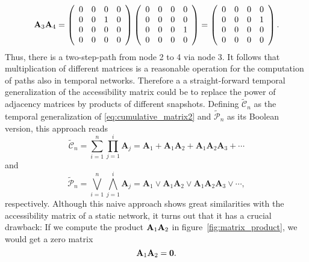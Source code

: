 \begin{equation}\label{eq:matrix_multi_example}
\mat{A}_3 \mat{A}_4=\left( \begin{array}{cccc}%
0 & 0 & 0 & 0 \\
 0 & 0 & 1 & 0 \\
0 & 0 & 0 & 0 \\
0 & 0 & 0 & 0 \end{array} \right)%
\left( \begin{array}{cccc}%
0 & 0 & 0 & 0 \\
 0 & 0 & 0 & 0 \\
0 & 0 & 0 & 1 \\
0 & 0 & 0 & 0 \end{array} \right)%
=%
\left( \begin{array}{cccc}%
0 & 0 & 0 & 0 \\
 0 & 0 & 0 & 1 \\
0 & 0 & 0 & 0 \\
0 & 0 & 0 & 0 \end{array} \right).%
\end{equation}
Thus, there is a two-step-path from node 2 to 4 via node 3.
It follows that multiplication of different matrices is a reasonable operation for the computation of paths also in temporal networks.
Therefore a a straight-forward temporal generalization of the accessibility matrix could be to replace the power of adjacency matrices by products of different snapshots.
Defining $\tilde{\mathcal{C}}_n$ as the temporal generalization of \eqref{eq:cumulative_matrix2} and $\tilde{\mathcal{P}}_n$ as its Boolean version, this approach reads
\begin{equation*}%
\tilde{\mathcal{C}}_n= \sum _{i=1} ^n \prod _{j=1} ^i \mathbf{A}_j = \mathbf{A}_1 + \mathbf{A}_1 \mathbf{A}_2 + \mathbf{A}_1 \mathbf{A}_2 \mathbf{A}_3 + \cdots
\end{equation*}
and
\begin{equation}\label{eq:wrong_access}
\tilde{\mathcal{P}}_n= \bigvee _{i=1} ^n \bigwedge _{j=1} ^i \mathbf{A}_j = \mathbf{A}_1 \vee \mathbf{A}_1 \mathbf{A}_2 \vee \mathbf{A}_1 \mathbf{A}_2 \mathbf{A}_3 \vee \cdots ,
\end{equation}
respectively.
Although this naive approach shows great similarities with the accessibility matrix of a static network, it turns out that it has a crucial drawback:
If we compute the product $\mathbf{A}_1 \mathbf{A}_2$ in figure~\ref{fig:matrix_product}, we would get a zero matrix
\begin{equation}\label{eq:zero_matrix_product}
\mathbf{A}_1 \mathbf{A}_2 = \mathbf{0} .
\end{equation}
